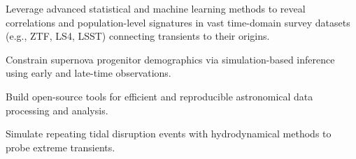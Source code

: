 


\begin{cvpubs}


\cvpub
{ %
\begin{cvitems}
    \item Leverage advanced statistical and machine learning methods to reveal correlations and population-level signatures in vast time-domain survey datasets (e.g., ZTF, LS4, LSST) connecting transients to their origins.
    \item Constrain supernova progenitor demographics via simulation-based inference using early and late-time observations.
    \item Build open-source tools for efficient and reproducible astronomical data processing and analysis.
    \item Simulate repeating tidal disruption events with hydrodynamical methods to probe extreme transients.
\end{cvitems}
}


\end{cvpubs}